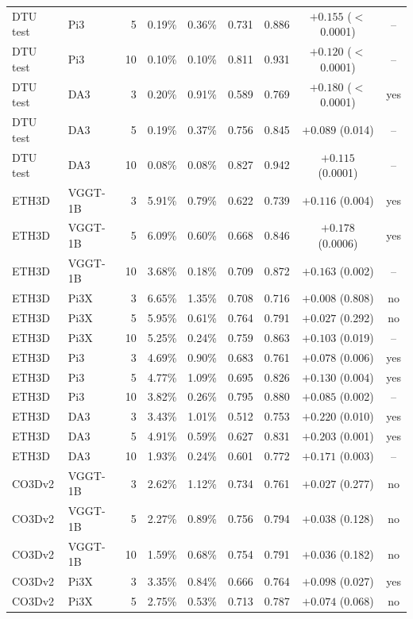 \begin{tabular}{llrcccccc}
DTU test & Pi3 & 5 & 0.19\% & 0.36\% & 0.731 & 0.886 & $+0.155$ ($<$0.0001) & -- \\
DTU test & Pi3 & 10 & 0.10\% & 0.10\% & 0.811 & 0.931 & $+0.120$ ($<$0.0001) & -- \\
DTU test & DA3 & 3 & 0.20\% & 0.91\% & 0.589 & 0.769 & $+0.180$ ($<$0.0001) & yes \\
DTU test & DA3 & 5 & 0.19\% & 0.37\% & 0.756 & 0.845 & $+0.089$ (0.014) & -- \\
DTU test & DA3 & 10 & 0.08\% & 0.08\% & 0.827 & 0.942 & $+0.115$ (0.0001) & -- \\
\midrule
ETH3D & VGGT-1B & 3 & 5.91\% & 0.79\% & 0.622 & 0.739 & $+0.116$ (0.004) & yes \\
ETH3D & VGGT-1B & 5 & 6.09\% & 0.60\% & 0.668 & 0.846 & $+0.178$ (0.0006) & yes \\
ETH3D & VGGT-1B & 10 & 3.68\% & 0.18\% & 0.709 & 0.872 & $+0.163$ (0.002) & -- \\
ETH3D & Pi3X & 3 & 6.65\% & 1.35\% & 0.708 & 0.716 & $+0.008$ (0.808) & no \\
ETH3D & Pi3X & 5 & 5.95\% & 0.61\% & 0.764 & 0.791 & $+0.027$ (0.292) & no \\
ETH3D & Pi3X & 10 & 5.25\% & 0.24\% & 0.759 & 0.863 & $+0.103$ (0.019) & -- \\
ETH3D & Pi3 & 3 & 4.69\% & 0.90\% & 0.683 & 0.761 & $+0.078$ (0.006) & yes \\
ETH3D & Pi3 & 5 & 4.77\% & 1.09\% & 0.695 & 0.826 & $+0.130$ (0.004) & yes \\
ETH3D & Pi3 & 10 & 3.82\% & 0.26\% & 0.795 & 0.880 & $+0.085$ (0.002) & -- \\
ETH3D & DA3 & 3 & 3.43\% & 1.01\% & 0.512 & 0.753 & $+0.220$ (0.010) & yes \\
ETH3D & DA3 & 5 & 4.91\% & 0.59\% & 0.627 & 0.831 & $+0.203$ (0.001) & yes \\
ETH3D & DA3 & 10 & 1.93\% & 0.24\% & 0.601 & 0.772 & $+0.171$ (0.003) & -- \\
\midrule
CO3Dv2 & VGGT-1B & 3 & 2.62\% & 1.12\% & 0.734 & 0.761 & $+0.027$ (0.277) & no \\
CO3Dv2 & VGGT-1B & 5 & 2.27\% & 0.89\% & 0.756 & 0.794 & $+0.038$ (0.128) & no \\
CO3Dv2 & VGGT-1B & 10 & 1.59\% & 0.68\% & 0.754 & 0.791 & $+0.036$ (0.182) & no \\
CO3Dv2 & Pi3X & 3 & 3.35\% & 0.84\% & 0.666 & 0.764 & $+0.098$ (0.027) & yes \\
CO3Dv2 & Pi3X & 5 & 2.75\% & 0.53\% & 0.713 & 0.787 & $+0.074$ (0.068) & no \\

\end{tabular}
